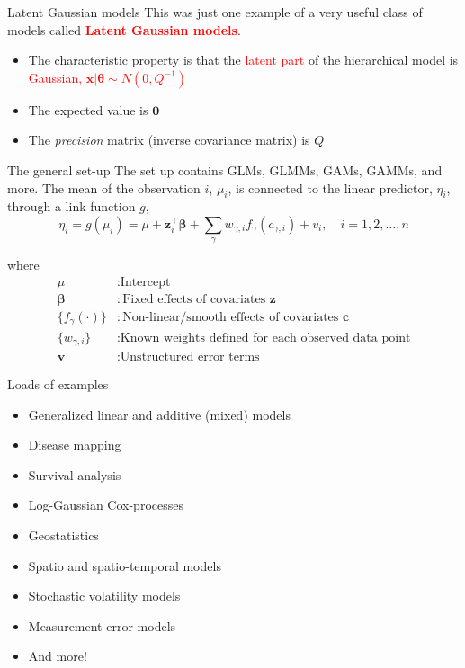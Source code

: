 \documentclass[
  ignorenonframetext,
]{beamer}
\providecommand{\tightlist}{%
  \setlength{\itemsep}{0pt}\setlength{\parskip}{0pt}}
\begin{document}
\begin{frame}{Latent Gaussian models}
\protect\hypertarget{latent-gaussian-models-1}{}
This was just one example of a very useful class of models called
\textcolor{red}{\bf Latent Gaussian models}.

\begin{itemize}
\tightlist
\item
  The characteristic property is that the \textcolor{red}{latent part}
  of the hierarchical model is
  \textcolor{red}{Gaussian,  \(\boldsymbol{x} | \boldsymbol{\theta} \sim N(0, {Q}^{-1})\)}
\item
  The expected value is \(\boldsymbol{0}\)
\item
  The \emph{precision} matrix (inverse covariance matrix) is \({Q}\)
\end{itemize}
\end{frame}

\begin{frame}{The general set-up}
\protect\hypertarget{the-general-set-up}{}
The set up contains GLMs, GLMMs, GAMs, GAMMs, and more. The mean of the
observation \(i\), \(\mu_i\), is connected to the linear predictor,
\(\eta_i\), through a link function \(g\), \[
\eta_i = g(\mu_i) = \mu + \boldsymbol{z}_i^\top \boldsymbol{\beta}+\sum_{\gamma} w_{\gamma, i} f_\gamma(c_{\gamma,i})+v_i, \quad i = 1,2,\ldots,n
\]

where \[
\begin{aligned}
\mu &: \text{Intercept}\\
        \boldsymbol{\beta} &: \text{Fixed effects of covariates \(\boldsymbol{z}\)}\\
        \{f_\gamma(\cdot)\} &: \text{Non-linear/smooth effects of covariates \(\boldsymbol{c}\)}\\
        \{w_{\gamma,i}\} &: \text{Known weights defined for each observed data point}\\
        \boldsymbol{v} &: \text{Unstructured error terms}
\end{aligned}
\]
\end{frame}

\begin{frame}{Loads of examples}
\protect\hypertarget{loads-of-examples}{}
\begin{itemize}
\tightlist
\item
  Generalized linear and additive (mixed) models
\item
  Disease mapping
\item
  Survival analysis
\item
  Log-Gaussian Cox-processes
\item
  Geostatistics
\item
  Spatio and spatio-temporal models
\item
  Stochastic volatility models
\item
  Measurement error models
\item
  And more!
\end{itemize}
\end{frame}
\end{document}
